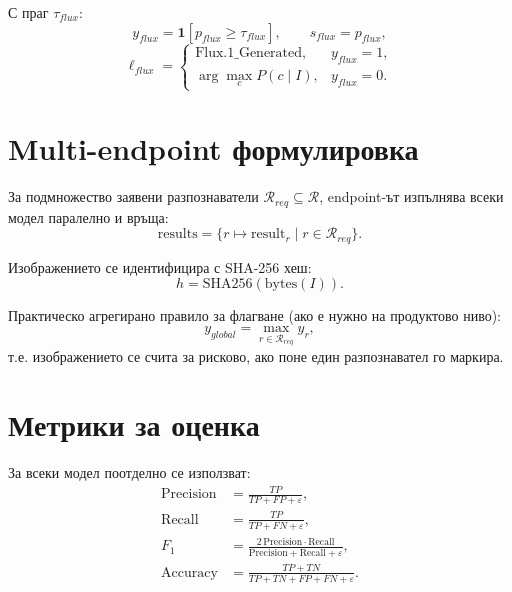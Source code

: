 \documentclass[12pt,a4paper]{article}
\begin{document}
С праг $\tau_{flux}$:
\begin{equation}
y_{flux}=\mathbf{1}[p_{flux}\ge\tau_{flux}],\qquad s_{flux}=p_{flux},
\end{equation}
\begin{equation}
\ell_{flux}=
\begin{cases}
\text{Flux.1\_Generated}, & y_{flux}=1,\\
\arg\max\limits_{c} P(c\mid I), & y_{flux}=0.
\end{cases}
\end{equation}

\section{Multi-endpoint формулировка}

За подмножество заявени разпознаватели $\mathcal{R}_{req}\subseteq\mathcal{R}$,
endpoint-ът изпълнява всеки модел паралелно и връща:
\begin{equation}
\text{results} = \{r \mapsto \text{result}_r \mid r\in\mathcal{R}_{req}\}.
\end{equation}

Изображението се идентифицира с SHA-256 хеш:
\begin{equation}
h = \text{SHA256}(\text{bytes}(I)).
\end{equation}

Практическо агрегирано правило за флагване (ако е нужно на продуктово ниво):
\begin{equation}
y_{global} = \max_{r\in\mathcal{R}_{req}} y_r,
\end{equation}
т.е. изображението се счита за рисково, ако поне един разпознавател го маркира.

\section{Метрики за оценка}

За всеки модел поотделно се използват:
\begin{align}
\text{Precision} &= \frac{TP}{TP+FP+\varepsilon}, \\
\text{Recall}    &= \frac{TP}{TP+FN+\varepsilon}, \\
F_1              &= \frac{2\,\text{Precision}\cdot\text{Recall}}
                         {\text{Precision}+\text{Recall}+\varepsilon}, \\
\text{Accuracy}  &= \frac{TP+TN}{TP+TN+FP+FN+\varepsilon}.
\end{align}
\end{document}
